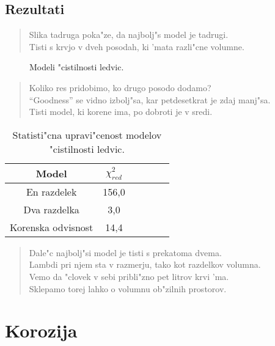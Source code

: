 \documentclass[a4paper,10pt]{article}
\begin{document}
\subsection{Rezultati}

\begin{verse}
 Slika tadruga poka"ze, da najbolj"s model je tadrugi. \\
 Tisti s krvjo v dveh posodah, ki 'mata razli"cne volumne. \\
\end{verse}

\begin{figure}
 
  \caption{Modeli "cistilnosti ledvic. }
  \label{fig:ledvice}
\end{figure}

\begin{verse}
 Koliko res pridobimo, ko drugo posodo dodamo? \\
 ``Goodness'' se vidno izbolj"sa, kar petdesetkrat je zdaj manj"sa. \\
 Tisti model, ki korene ima, po dobroti je v sredi. 
\end{verse}

\begin{table}[h]
 \centering
\begin{tabular}{|c|c|c|c|c|c|}
 \hline
  Model & $\chi^2_{red}$ \\
\hline
  En razdelek & 156,0 \\
  Dva razdelka & 3,0 \\
  Korenska odvisnost & 14,4 \\
\hline
\end{tabular}
\caption{Statisti"cna upravi"cenost modelov "cistilnosti ledvic. }
\label{tab:ledvice}
\end{table}

\begin{verse}
 Dale"c najbolj"si model je tisti s prekatoma dvema. \\
 Lambdi pri njem sta v razmerju, tako kot razdelkov volumna. \\
 Vemo da "clovek v sebi pribli"zno pet litrov krvi 'ma. \\
 Sklepamo torej lahko o volumnu ob"zilnih prostorov. 
\end{verse}

\section{Korozija}
\end{document}
